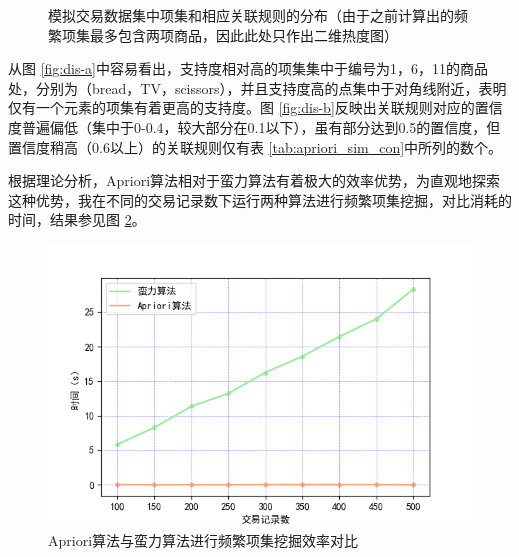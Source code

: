 \documentclass[12pt,a4paper]{article}
\theoremstyle{definition}
\begin{document}
\vspace{-0.012\linewidth}
\begin{figure}[H]
	\centering
	\caption{模拟交易数据集中项集和相应关联规则的分布（由于之前计算出的频繁项集最多包含两项商品，因此此处只作出二维热度图）}
	\label{fig:dis}
\end{figure}

从图 \ref{fig:dis-a}中容易看出，支持度相对高的项集集中于编号为1，6，11的商品处，分别为（bread，TV，scissors），并且支持度高的点集中于对角线附近，表明仅有一个元素的项集有着更高的支持度。图 \ref{fig:dis-b}反映出关联规则对应的置信度普遍偏低（集中于0-0.4，较大部分在0.1以下），虽有部分达到0.5的置信度，但置信度稍高（0.6以上）的关联规则仅有表 \ref{tab:apriori_sim_con}中所列的数个。

\vspace{0.01\linewidth}
根据理论分析，Apriori算法相对于蛮力算法有着极大的效率优势，为直观地探索这种优势，我在不同的交易记录数下运行两种算法进行频繁项集挖掘，对比消耗的时间，结果参见图 \ref{fig:time_com}。

\begin{figure}[H]
	\centering
	\includegraphics[width=0.7\linewidth]{img/time_kline.png}
	\caption{Apriori算法与蛮力算法进行频繁项集挖掘效率对比}
	\label{fig:time_com}
\end{figure}
\end{document}
